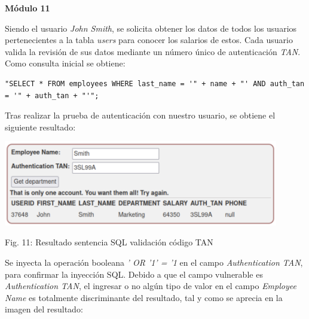 \documentclass[12pt,oneside,a4paper]{book}
\begin{document}
\begin{enumerate}
\begin{enumerate}
        \vspace{2em}

        \textbf{Módulo 11}
        
        \vspace{1em}

        \hspace{20pt}
        Siendo el usuario \textit{John Smith}, se solicita obtener los datos de todos los usuarios pertenecientes a la tabla \textit{users} para conocer los salarios de estos. Cada usuario valida la revisión de sus datos mediante un número único de autenticación \textit{TAN}. Como consulta inicial se obtiene:

        \vspace{1em}
        
        \begin{verbatim}
"SELECT * FROM employees WHERE last_name = '" + name + "' AND auth_tan
= '" + auth_tan + "'";
        \end{verbatim}
        
        \hspace{20pt}
        Tras realizar la prueba de autenticación con nuestro usuario, se obtiene el siguiente resultado:

        \newpage
        
        \begin{center}
            \includegraphics[width=12cm]{img/sqli8.png}
            
            \vspace{0.1em}
            
            Fig. 11: Resultado sentencia SQL validación código TAN
        \end{center}
        
        \vspace{2em}

        \hspace{20pt}
        Se inyecta la operación booleana \textit{' OR '1' = '1} en el campo \textit{Authentication TAN}, para confirmar la inyección SQL. Debido a que el campo vulnerable es \textit{Authentication TAN}, el ingresar o no algún tipo de valor en el campo \textit{Employee Name} es totalmente discriminante del resultado, tal y como se aprecia en la imagen del resultado:


\end{enumerate}
\end{enumerate}
\end{document}
